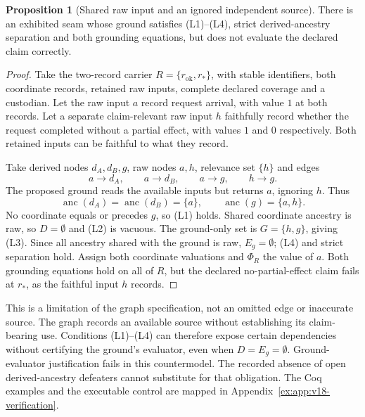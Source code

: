 \documentclass[11pt]{article}
\theoremstyle{definition}
\newtheorem{proposition}{Proposition}[section]
\begin{document}
\begin{proposition}[Shared raw input and an ignored independent source]\label{ex:prop:raw-source-bypass}
There is an exhibited seam whose ground satisfies (L1)--(L4), strict derived-ancestry separation and both grounding equations, but does not evaluate the declared claim correctly.
\end{proposition}
\begin{proof}
Take the two-record carrier $R=\{r_{\mathrm{ok}},r_*\}$, with stable identifiers, both coordinate records, retained raw inputs, complete declared coverage and a custodian. Let the raw input $a$ record request arrival, with value $1$ at both records. Let a separate claim-relevant raw input $h$ faithfully record whether the request completed without a partial effect, with values $1$ and $0$ respectively. Both retained inputs can be faithful to what they record.

Take derived nodes $d_A,d_B,g$, raw nodes $a,h$, relevance set $\{h\}$ and edges
\[
a\to d_A,\qquad a\to d_B,\qquad a\to g,\qquad h\to g.
\]
The proposed ground reads the available inputs but returns $a$, ignoring $h$. Thus
\[
\operatorname{anc}(d_A)=\operatorname{anc}(d_B)=\{a\},
\qquad\operatorname{anc}(g)=\{a,h\}.
\]
No coordinate equals or precedes $g$, so (L1) holds. Shared coordinate ancestry is raw, so $D=\emptyset$ and (L2) is vacuous. The ground-only set is $G=\{h,g\}$, giving (L3). Since all ancestry shared with the ground is raw, $E_g=\emptyset$; (L4) and strict separation hold. Assign both coordinate valuations and $\Phi_R$ the value of $a$. Both grounding equations hold on all of $R$, but the declared no-partial-effect claim fails at $r_*$, as the faithful input $h$ records.
\end{proof}

This is a limitation of the graph specification, not an omitted edge or inaccurate source. The graph records an available source without establishing its claim-bearing use. Conditions (L1)--(L4) can therefore expose certain dependencies without certifying the ground's evaluator, even when $D=E_g=\emptyset$. Ground-evaluator justification fails in this countermodel. The recorded absence of open derived-ancestry defeaters cannot substitute for that obligation. The Coq examples and the executable control are mapped in Appendix~\ref{ex:app:v18-verification}.
\end{document}
